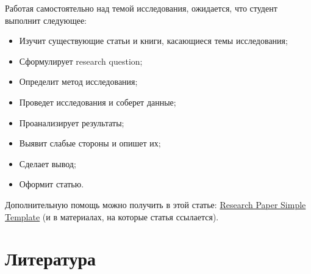 \documentclass[nobrand,anonymous,nodate,nosecurity]{huawei}
\begin{document}
Работая самостоятельно над темой исследования, ожидается, что студент выполнит следующее:
\begin{itemize}
    \item Изучит существующие статьи и книги, касающиеся темы исследования;
    \item Сформулирует research question;
    \item Определит метод исследования;
    \item Проведет исследования и соберет данные;
    \item Проанализирует результаты;
    \item Выявит слабые стороны и опишет их;
    \item Сделает вывод;
    \item Оформит статью.
\end{itemize}

Дополнительную помощь можно получить в этой статье:
\href{https://www.yegor256.com/2022/08/24/research-paper-template.html}{Research Paper Simple Template}
(и в материалах, на которые статья ссылается).

\section{Литература}
\end{document}
